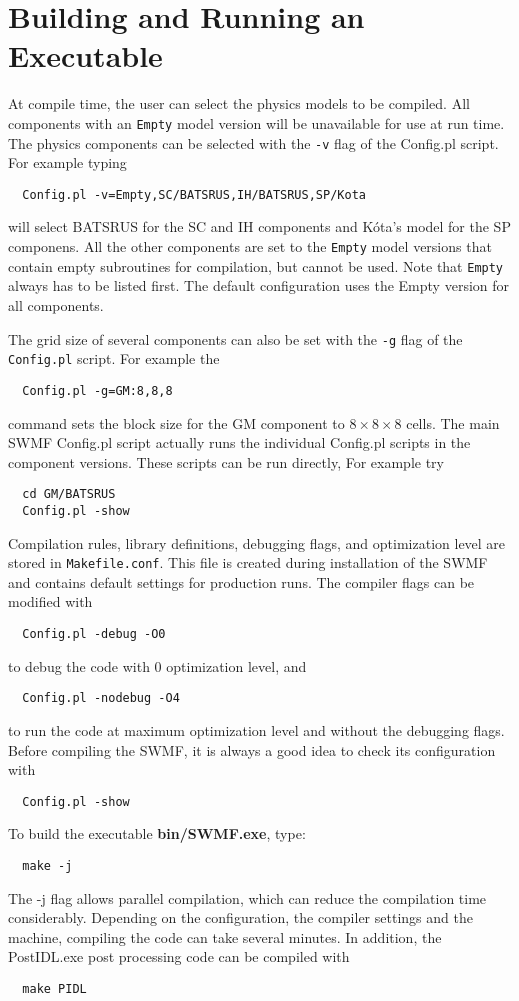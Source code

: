 \section{Building and Running an Executable}

At compile time, the user can select the physics models to be
compiled.  All components with an {\tt Empty} model version will be 
unavailable for use at run time.  
The physics components can be selected with the {\tt -v} flag
of the Config.pl script. For example typing
\begin{verbatim}
  Config.pl -v=Empty,SC/BATSRUS,IH/BATSRUS,SP/Kota
\end{verbatim}
will select BATSRUS for the SC and IH components and K\'ota's model for
the SP componens. All the other components are set to 
the {\tt Empty} model versions that contain empty subroutines for compilation, 
but cannot be used. Note that {\tt Empty} always has to be listed first.
The default configuration uses the Empty version for all components.

The grid size of several components can also be set with the {\tt -g}
flag of the {\tt Config.pl} script. For example the 
\begin{verbatim}
  Config.pl -g=GM:8,8,8
\end{verbatim}
command sets the block size for the GM component to $8\times 8\times 8$ cells.
The main SWMF Config.pl script actually runs the individual Config.pl
scripts in the component versions. These scripts can be run directly,
For example try
\begin{verbatim}
  cd GM/BATSRUS
  Config.pl -show
\end{verbatim}
Compilation rules, library definitions, debugging flags, and optimization 
level are stored in {\tt Makefile.conf}. This file is created during
installation of the SWMF and contains default settings for production runs.
The compiler flags can be modified with
\begin{verbatim}
  Config.pl -debug -O0
\end{verbatim}
to debug the code with 0 optimization level, and
\begin{verbatim}
  Config.pl -nodebug -O4
\end{verbatim}
to run the code at maximum optimization level and without the debugging flags.
Before compiling the SWMF, it is always a good idea to check its configuration
with
\begin{verbatim}
  Config.pl -show
\end{verbatim}
To build the executable {\bf bin/SWMF.exe}, type:
\begin{verbatim}
  make -j
\end{verbatim} 
The -j flag allows parallel compilation, which can reduce the compilation
time considerably.
Depending on the configuration, the compiler settings and the machine, 
compiling the code can take several minutes. 
In addition, the PostIDL.exe post processing code can be compiled with
\begin{verbatim}
  make PIDL
\end{verbatim} 

